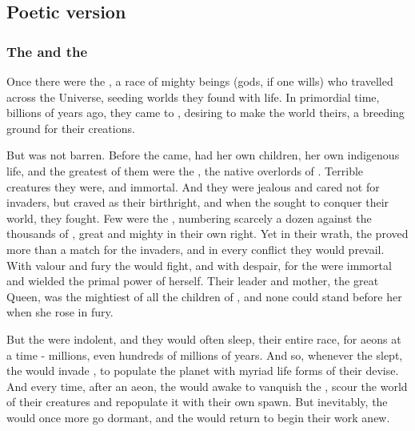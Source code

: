 




\subsection{Poetic version}
\subsubsection{The \voyagers{} and the \krakens}
Once there were the \voyagers, a race of mighty beings (gods, if one wills) who travelled across the Universe, seeding worlds they found with life. In primordial time, billions of years ago, they came to \Miith{}, desiring to make the world theirs, a breeding ground for their creations. 

But \Miith{} was not barren. Before the \voyagers{} came, \Miith{} had her own children, her own indigenous life, and the greatest of them were the \krakens, the native overlords of \Miith{}. Terrible creatures they were, and immortal. And they were jealous and cared not for invaders, but craved \Miith{} as their birthright, and when the \voyagers{} sought to conquer their world, they fought. Few were the \krakens{}, numbering scarcely a dozen against the thousands of \voyagers{}, great and mighty in their own right. Yet in their wrath, the \krakens{} proved more than a match for the invaders, and in every conflict they would prevail. With valour and fury the \voyagers{} would fight, and with despair, for the \krakens{} were immortal and wielded the primal power of \Miith{} herself. Their leader and mother, the great \Kraken{} Queen, was the mightiest of all the children of \Miith{}, and none could stand before her when she rose in fury. 

But the \krakens{} were indolent, and they would often sleep, their entire race, for aeons at a time - millions, even hundreds of millions of years. And so, whenever the \krakens{} slept, the \voyagers{} would invade \Miith{}, to populate the planet with myriad life forms of their devise. And every time, after an aeon, the \krakens{} would awake to vanquish the \voyagers{}, scour the world of their creatures and repopulate it with their own spawn. But inevitably, the \krakens{} would once more go dormant, and the \voyagers{} would return to begin their work anew. 

